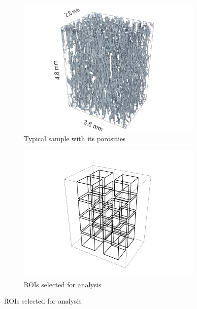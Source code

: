 \documentclass[a4paper,fleqn]{DC_ArtStyle}
\begin{document}
	\begin{figure}[!h]
		\centering
		\begin{subfigure}[t]{.45\linewidth}
			\includegraphics[height=0.8\linewidth]{../Results/Scans/2009_213_L}
			\caption{Typical sample with its porosities}
		\end{subfigure}
		\begin{subfigure}[t]{0.45\linewidth}
			\includegraphics[height=0.8\linewidth, trim=50 50 50 0]{../Results/ROIs/ROIs}
			\caption{ROIs selected for analysis}
		\end{subfigure}
		\label{FigCortSamples}
	\end{figure}
\end{document}
